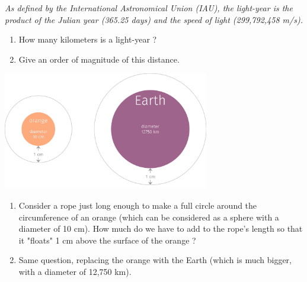 \documentclass[12pt,a4paper,article,english,firamath]{nsi}
\begin{document}
\maketitle


\begin{exercice}[]
\end{exercice}


\begin{exercice}[]
    \begin{center}
        \textit{
        As defined by the International Astronomical Union (IAU), the light-year is the product of the Julian year (365.25 days) and the speed of light (299,792,458 m/s).}
    \end{center}
    \begin{enumerate}
        \item How many kilometers is a light-year ?
        \item Give an order of magnitude of this distance.
    \end{enumerate}
\end{exercice}

\begin{exercice}[]
\end{exercice}

\begin{exercice}

\end{exercice}

\begin{exercice}[]
\begin{center}
    \includegraphics[width=9cm]{img/orange_and_earth.png}
\end{center}
\begin{enumerate}
    \item Consider a rope just long enough to make a full circle around the circumference of an orange (which can be considered as a sphere with a diameter of 10 cm). How much do we have to add to the rope's length so that it "floats" 1 cm above the surface of the orange ?
    \item Same question, replacing the orange with the Earth (which is much bigger, with a diameter of 12,750 km).
\end{enumerate}
\end{exercice}
\end{document}
